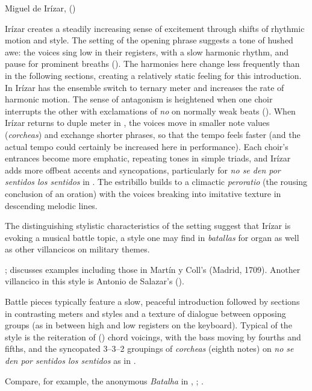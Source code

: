 \begin{musicexample}
    \caption{Miguel de Irízar,  ()}

    \label{music:Irizar-Si_los_sentidos}
\end{musicexample}

Irízar creates a steadily increasing sense of excitement through shifts of
rhythmic motion and style.
The setting of the opening phrase suggests a tone of hushed awe: the voices sing
low in their registers, with a slow harmonic rhythm, and pause for prominent
breaths ().
The harmonies here change less frequently than in the following sections,
creating a relatively static feeling for this introduction.
In  Irízar has the ensemble switch to ternary meter and increases
the rate of harmonic motion.
The sense of antagonism is heightened when one choir interrupts the other with
exclamations of \emph{no} on normally weak beats ().
When Irízar returns to duple meter in , the voices move in smaller
note values (\emph{corcheas}) and exchange shorter phrases, so that the tempo
feels faster (and the actual tempo could certainly be increased here in
performance).
Each choir's entrances become more emphatic, repeating tones in simple triads,
and Irízar adds more offbeat accents and syncopations, particularly for \emph{no
se den por sentidos los sentidos} in .
The estribillo builds to a climactic \emph{peroratio} (the rousing conclusion of
an oration) with the voices breaking into imitative texture in descending
melodic lines.

The distinguishing stylistic characteristics of the setting suggest that Irízar
is evoking a musical battle topic, a style one may find in \emph{batallas} for
organ as well as other villancicos on military themes.%
\begin{Footnote}
    \Autocite[]{Grove}; 
    \autocite{Sutton:IberianBatalla} discusses examples including those in
    Martín y Coll's  (Madrid, 1709).
    Another villancico in this style is Antonio de Salazar's  ().
\end{Footnote}
Battle pieces typically feature a slow, peaceful introduction followed by
sections in contrasting meters and styles and a texture of dialogue between
opposing groups (as in between high and low registers on the keyboard).  
Typical of the style is the reiteration of  () chord voicings, with the bass moving by fourths and fifths, and the
syncopated 3--3--2 groupings of \emph{corcheas} (eighth notes) on \emph{no se
den por sentidos los sentidos} as in .%
\begin{Footnote}
    Compare, for example, the anonymous \emph{Batalha} in ,
    ; \autocite{Araujo:Batalla}.  
\end{Footnote}

